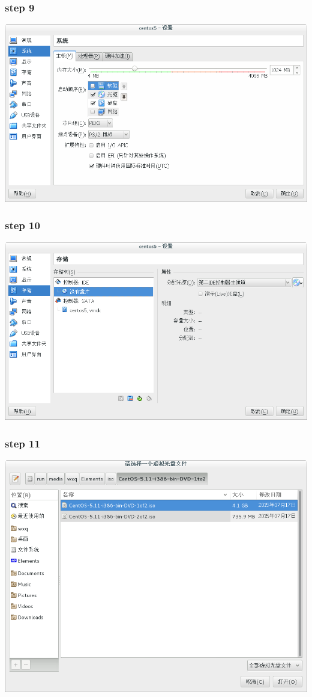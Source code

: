 \documentclass[xcolor=svgnames,presentation]{beamer}
\begin{document}
\begin{frame}
\frametitle{step 9}
\label{sec-1-9}

\begin{center}
\includegraphics[width=.9\linewidth]{img/vb11.png}
\end{center}
\end{frame}
\begin{frame}
\frametitle{step 10}
\label{sec-1-10}

\begin{center}
\includegraphics[width=.9\linewidth]{img/vb12.png}
\end{center}
\end{frame}
\begin{frame}
\frametitle{step 11}
\label{sec-1-11}

\begin{center}
\includegraphics[width=.9\linewidth]{img/vb13.png}
\end{center}
\end{frame}
\end{document}
